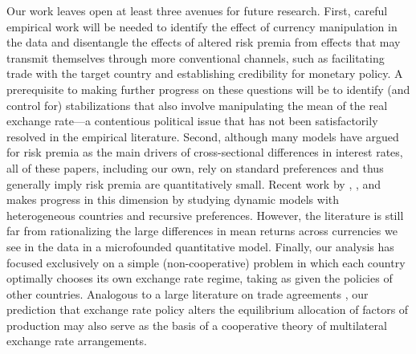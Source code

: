 \documentclass[12pt,letter]{article}
\theoremstyle{break} \theorembodyfont{\normalfont\itshape}
\theoremstyle{break}
\theoremstyle{break} \theorembodyfont{\normalfont\itshape}
\theoremstyle{break} \theorembodyfont{\normalfont\itshape}
\begin{document}
Our work leaves open at least three avenues for future research.
First, careful empirical work will be needed to identify the effect of
currency manipulation in the data and disentangle the effects of
altered risk premia from effects that may transmit themselves through
more conventional channels, such as facilitating trade with the target
country and establishing credibility for monetary policy. A
prerequisite to making further progress on these questions will be to
identify (and control for) stabilizations that also involve
manipulating the mean of the real exchange rate---a contentious
political issue that has not been satisfactorily resolved in the
empirical literature. Second, although many models have argued for
risk premia as the main drivers of cross-sectional differences in
interest rates, all of these papers, including our own, rely on
standard preferences and thus generally imply risk premia are
quantitatively small. Recent work by \cite{GourinchasReyGovillot2010},
\cite{DavidHenriksenSimonovska2014}, and
\cite{ColacitoCroceGavazzoniReady2014} makes progress in this
dimension by studying dynamic models with heterogeneous countries and
recursive preferences. However, the literature is still far from
rationalizing the large differences in mean returns across currencies
we see in the data in a microfounded quantitative model. Finally, our
analysis has focused exclusively on a simple (non-cooperative) problem
in which each country optimally chooses its own exchange rate regime,
taking as given the policies of other countries. Analogous to a large
literature on trade agreements \citep{BagwellStaiger1999,Ossa2011},
our prediction that exchange rate policy alters the equilibrium
allocation of factors of production may also serve as the basis of a
cooperative theory of multilateral exchange rate arrangements.

\newpage


 

\end{document}
